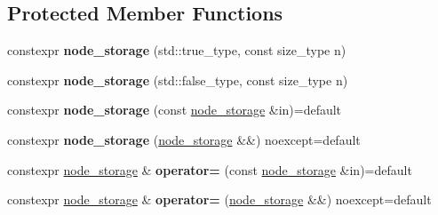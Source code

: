 \subsection*{Protected Member Functions}
\begin{DoxyCompactItemize}
\item 
\mbox{\label{classsequoia_1_1maths_1_1graph__impl_1_1node__storage_a5bb04b30c3cce1d15e9df2b0841b5acc}} 
constexpr {\bfseries node\+\_\+storage} (std\+::true\+\_\+type, const size\+\_\+type n)
\item 
\mbox{\label{classsequoia_1_1maths_1_1graph__impl_1_1node__storage_a334bc224602553e27e35644d2adb7730}} 
constexpr {\bfseries node\+\_\+storage} (std\+::false\+\_\+type, const size\+\_\+type n)
\item 
\mbox{\label{classsequoia_1_1maths_1_1graph__impl_1_1node__storage_ac721ed2ce293a83f0dc90d8335ce1175}} 
constexpr {\bfseries node\+\_\+storage} (const \mbox{\hyperlink{classsequoia_1_1maths_1_1graph__impl_1_1node__storage}{node\+\_\+storage}} \&in)=default
\item 
\mbox{\label{classsequoia_1_1maths_1_1graph__impl_1_1node__storage_a4e0c5ba79d4d7fd5c9e571b9f97e3c21}} 
constexpr {\bfseries node\+\_\+storage} (\mbox{\hyperlink{classsequoia_1_1maths_1_1graph__impl_1_1node__storage}{node\+\_\+storage}} \&\&) noexcept=default
\item 
\mbox{\label{classsequoia_1_1maths_1_1graph__impl_1_1node__storage_aba17607e84a75189446e0f01082c3d1e}} 
constexpr \mbox{\hyperlink{classsequoia_1_1maths_1_1graph__impl_1_1node__storage}{node\+\_\+storage}} \& {\bfseries operator=} (const \mbox{\hyperlink{classsequoia_1_1maths_1_1graph__impl_1_1node__storage}{node\+\_\+storage}} \&in)=default
\item 
\mbox{\label{classsequoia_1_1maths_1_1graph__impl_1_1node__storage_a1641eb06854f37ffda644df7d2f23e38}} 
constexpr \mbox{\hyperlink{classsequoia_1_1maths_1_1graph__impl_1_1node__storage}{node\+\_\+storage}} \& {\bfseries operator=} (\mbox{\hyperlink{classsequoia_1_1maths_1_1graph__impl_1_1node__storage}{node\+\_\+storage}} \&\&) noexcept=default

\end{DoxyCompactItemize}
